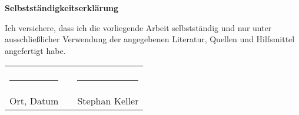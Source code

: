 \thispagestyle{empty}
\vspace*{10em}
\begin{center}
\Large\textbf{Selbstständigkeitserklärung}
\end{center}
\vspace{2em}
Ich versichere, dass ich die vorliegende Arbeit selbstständig und nur unter ausschließlicher Verwendung der angegebenen Literatur, Quellen und Hilfsmittel angefertigt habe.
\begin{tabular}{lll}
\\
\\
\rule{0.3\textwidth}{0.4pt} & \hspace{8em} & \rule{0.3\textwidth}{0.4pt}\\
Ort, Datum & & Stephan Keller
\end{tabular}

